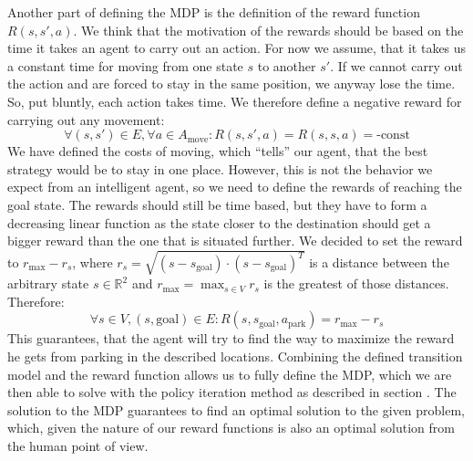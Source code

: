     Another part of defining the MDP is the definition of the reward function $R(s,s',a)$. We think that the motivation of the rewards should be based on the time it takes an agent to carry out an action. For now we assume, that it takes us a constant time for moving from one state $s$ to another $s'$. If we cannot carry out the action and are forced to stay in the same position, we anyway lose the time. So, put bluntly, each action takes time. We therefore define a negative reward for carrying out any movement:
    \begin{equation}
        \forall (s, s') \in E, \forall a \in A_{\mbox{move}}: R(s, s', a) = R(s, s, a) = \mbox{-const}
    \end{equation}
    We have defined the costs of moving, which ``tells'' our agent, that the best strategy would be to stay in one place. However, this is not the behavior we expect from an intelligent agent, so we need to define the rewards of reaching the goal state. The rewards should still be time based, but they have to form a decreasing linear function as the state closer to the destination should get a bigger reward than the one that is situated further. We decided to set the reward to $r_{\max} - r_s$, where $r_s = \sqrt{(s - s_{\mbox{goal}}) \cdot {(s - s_{\mbox{goal}})}^T}$ is a distance between the arbitrary state $s \in \mathbb{R}^2$ and $r_{\max} = \max_{s \in V}r_s$ is the greatest of those distances. Therefore:
    \begin{equation}
        \forall s \in V, (s,\mbox{goal}) \in E : R(s, s_{\mbox{goal}}, a_{\mbox{park}}) = r_{\max} - r_s
    \end{equation}
    This guarantees, that the agent will try to find the way to maximize the reward he gets from parking in the described locations.
    Combining the defined transition model and the reward function allows us to fully define the MDP, which we are then able to solve with the policy iteration method as described in section . The solution to the MDP guarantees to find an optimal solution to the given problem, which, given the nature of our reward functions is also an optimal solution from the human point of view.

